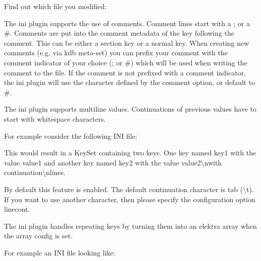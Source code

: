 Find out which file you modified\+:


\begin{DoxyCode}{0}
\DoxyCodeLine{}
\end{DoxyCode}


The ini plugin supports the use of comments. Comment lines start with a \textquotesingle{};\textquotesingle{} or a \textquotesingle{}\#\textquotesingle{}. Comments are put into the comment metadata of the key following the comment. This can be either a section key or a normal key. When creating new comments (e.\+g. via {\ttfamily kdb meta-\/set}) you can prefix your comment with the comment indicator of your choice (\textquotesingle{};\textquotesingle{} or \textquotesingle{}\#\textquotesingle{}) which will be used when writing the comment to the file. If the comment is not prefixed with a comment indicator, the ini plugin will use the character defined by the {\ttfamily comment} option, or default to \textquotesingle{}\#\textquotesingle{}.

The ini plugin supports multiline values. Continuations of previous values have to start with whitespace characters.

For example consider the following I\+NI file\+:


\begin{DoxyCode}{0}
\end{DoxyCode}


This would result in a Key\+Set containing two keys. One key named {\ttfamily key1} with the value {\ttfamily value1} and another key named {\ttfamily key2} with the value {\ttfamily value2\textbackslash{}nwith continuation\textbackslash{}nlines}.

By default this feature is enabled. The default continuation character is tab ({\ttfamily \textbackslash{}t}). If you want to use another character, then please specify the configuration option {\ttfamily linecont}.

The ini plugin handles repeating keys by turning them into an elektra array when the {\ttfamily array} config is set.

For example an I\+NI file looking like\+:


\begin{DoxyCode}{0}
\DoxyCodeLine{[sec]}
\end{DoxyCode}


